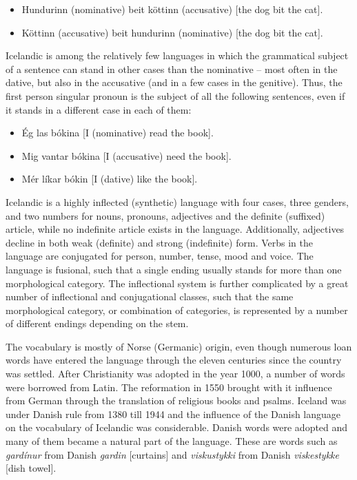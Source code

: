 \begin{multicols}{2}
\begin{itemize}
\item Hundurinn (nominative) beit köttinn (accusative) {[}the dog bit the cat{]}.
\item Köttinn (accusative) beit hundurinn (nominative) {[}the dog bit the cat{]}.
\end{itemize}


Icelandic is among the relatively few languages in which the grammatical subject of a sentence can stand in other cases than the nominative -- most often in the dative, but also in the accusative (and in a few cases in the genitive). Thus, the first person singular pronoun is the subject of all the following sentences, even if it stands in a different case in each of them:

\begin{itemize}
\item Ég las bókina {[}I (nominative) read the book{]}.
\item Mig vantar bókina {[I (accusative) need the book]}.
\item Mér líkar bókin {[I (dative) like the book]}.
\end{itemize}

Icelandic is a highly inflected (synthetic) language with four cases, three genders, and two numbers for nouns, pronouns, adjectives and the definite (suffixed) article, while no indefinite article exists in the language. Additionally, adjectives decline in both weak (definite) and strong (indefinite) form. Verbs in the language are conjugated for person, number, tense, mood and voice. The language is fusional, such that a single ending usually stands for more than one morphological category. The inflectional system is further complicated by a great number of inflectional and conjugational classes, such that the same morphological category, or combination of categories, is represented by a number of different endings depending on the stem.


The vocabulary is mostly of Norse (Germanic) origin, even though numerous loan words have entered the language through the eleven centuries since the country was settled. After Christianity was adopted in the year 1000, a number of words were borrowed from Latin. The reformation in 1550 brought with it influence from German through the translation of religious books and psalms. Iceland was under Danish rule from 1380 till 1944 and the influence of the Danish language on the vocabulary of Icelandic was considerable. Danish words were adopted and many of them became a natural part of the language. These are words such as \textit{gardínur} from Danish \textit{gardin} {[}curtains{]} and \textit{viskustykki} from Danish \textit{viskestykke} {[}dish towel{]}.


\end{multicols}
